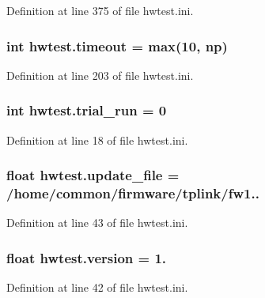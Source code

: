 Definition at line 375 of file hwtest.\-ini.

\hypertarget{namespacehwtest_a71b9053f13108a7a4c06692c840d6308}{
\subsubsection[{timeout}]{\setlength{\rightskip}{0pt plus 5cm}int hwtest.\-timeout = max(10, {\bf np})}}\label{namespacehwtest_a71b9053f13108a7a4c06692c840d6308}


Definition at line 203 of file hwtest.\-ini.

\hypertarget{namespacehwtest_a2974a3de34764ea05c838464d476f407}{
\subsubsection[{trial\-\_\-run}]{\setlength{\rightskip}{0pt plus 5cm}int hwtest.\-trial\-\_\-run = 0}}\label{namespacehwtest_a2974a3de34764ea05c838464d476f407}


Definition at line 18 of file hwtest.\-ini.

\hypertarget{namespacehwtest_a55a50eaac0f3463a3fc21e41b75050ab}{
\subsubsection[{update\-\_\-file}]{\setlength{\rightskip}{0pt plus 5cm}float hwtest.\-update\-\_\-file = /home/common/firmware/tplink/fw1..}}\label{namespacehwtest_a55a50eaac0f3463a3fc21e41b75050ab}


Definition at line 43 of file hwtest.\-ini.

\hypertarget{namespacehwtest_a4cd2f078f70d7159e347c0a9ddd51f84}{
\subsubsection[{version}]{\setlength{\rightskip}{0pt plus 5cm}float hwtest.\-version = 1.}}\label{namespacehwtest_a4cd2f078f70d7159e347c0a9ddd51f84}


Definition at line 42 of file hwtest.\-ini.

